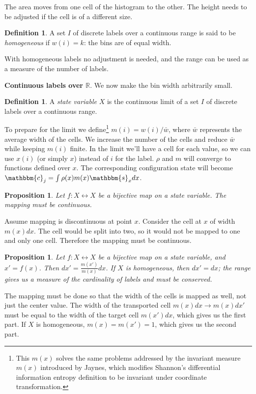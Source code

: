 \documentclass[twocolumn,floatfix,nofootinbib]{revtex4}   %
\theoremstyle{theorem}
\newtheorem{prop}[thm]{Proposition}
\theoremstyle{definition}
\newtheorem{defn}[thm]{Definition}
\begin{document}
The area moves from one cell of the histogram to the other. The height needs to be adjusted if the cell is of a different size.

\begin{defn}\label{discreteLabelHomogeneous}
A set $I$ of discrete labels over a continuous range is said to be \emph{homogeneous} if $w(i)=k$: the bins are of equal width.
\end{defn}

With homogeneous labels no adjustment is needed, and the range can be used as a measure of the number of labels.

\textbf{Continuous labels over $\mathbb{R}$}. We now make the bin width arbitrarily small.

\begin{defn}\label{continuousLabels}
A \emph{state variable} $X$ is the continuous limit of a set $I$ of discrete labels over a continuous range.
\end{defn}

To prepare for the limit we define\footnote{This $m(x)$ solves the same problems addressed by the invariant measure $m(x)$ introduced by Jaynes\cite{Jaynes}, which modifies Shannon's differential information entropy definition\cite{Shannon} to be invariant under coordinate transformation.} $m(i)=w(i)/\bar{w}$, where $\bar{w}$ represents the average width of the cells. We increase the number of the cells and reduce $\bar{w}$ while keeping $m(i)$ finite. In the limit we'll have a cell for each value, so we can use $x(i)$ (or simply $x$) instead of $i$ for the label. $\rho$ and $m$ will converge to functions defined over $x$. The corresponding configuration state will become $\mathbbm{c}_j=\int \rho(x) m(x) \mathbbm{s}_x dx$.

\begin{prop}\label{continuousMapping}
Let $f: X \leftrightarrow X$ be a bijective map on a state variable. The mapping must be continuous.
\end{prop}
Assume mapping is discontinuous at point $x$. Consider the cell at $x$ of width $m(x)dx$. The cell would be split into two, so it would not be mapped to one and only one cell. Therefore the mapping must be continuous.

\begin{prop}\label{widthMapping}
Let $f: X \leftrightarrow X$ be a bijective map on a state variable, and $x'=f(x)$. Then $dx' = \frac{m(x')}{m(x)} dx$. If $X$ is homogeneous, then $dx' = dx$; the range gives us a measure of the cardinality of labels and must be conserved.
\end{prop}
The mapping must be done so that the width of the cells is mapped as well, not just the center value. The width of the transported cell $m(x)dx \rightarrow m(x) dx'$ must be equal to the width of the target cell $m(x')dx$, which gives us the first part. If $X$ is homogeneous, $m(x)=m(x')=1$, which gives us the second part.
\end{document}
